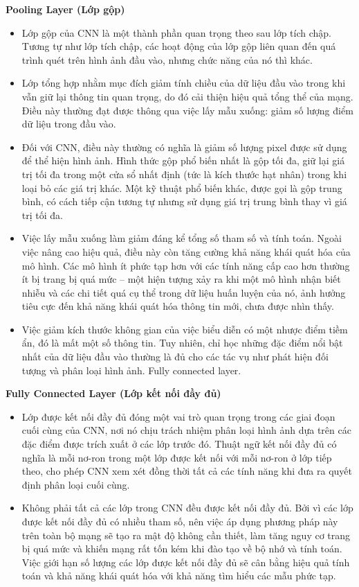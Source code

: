 \textbf{Pooling Layer (Lớp gộp)}
\begin{itemize}
	\item Lớp gộp của CNN là một thành phần quan trọng theo sau lớp tích chập. Tương tự như lớp tích chập, các hoạt động của lớp gộp liên quan đến quá trình quét trên hình ảnh đầu vào, nhưng chức năng của nó thì khác.
	\item Lớp tổng hợp nhằm mục đích giảm tính chiều của dữ liệu đầu vào trong khi vẫn giữ lại thông tin quan trọng, do đó cải thiện hiệu quả tổng thể của mạng. Điều này thường đạt được thông qua việc lấy mẫu xuống: giảm số lượng điểm dữ liệu trong đầu vào.
	\item Đối với CNN, điều này thường có nghĩa là giảm số lượng pixel được sử dụng để thể hiện hình ảnh. Hình thức gộp phổ biến nhất là gộp tối đa, giữ lại giá trị tối đa trong một cửa sổ nhất định (tức là kích thước hạt nhân) trong khi loại bỏ các giá trị khác. Một kỹ thuật phổ biến khác, được gọi là gộp trung bình, có cách tiếp cận tương tự nhưng sử dụng giá trị trung bình thay vì giá trị tối đa.
	\item Việc lấy mẫu xuống làm giảm đáng kể tổng số tham số và tính toán. Ngoài việc nâng cao hiệu quả, điều này còn tăng cường khả năng khái quát hóa của mô hình. Các mô hình ít phức tạp hơn với các tính năng cấp cao hơn thường ít bị trang bị quá mức – một hiện tượng xảy ra khi một mô hình nhận biết nhiễu và các chi tiết quá cụ thể trong dữ liệu huấn luyện của nó, ảnh hưởng tiêu cực đến khả năng khái quát hóa thông tin mới, chưa được nhìn thấy.
	\item Việc giảm kích thước không gian của việc biểu diễn có một nhược điểm tiềm ẩn, đó là mất một số thông tin. Tuy nhiên, chỉ học những đặc điểm nổi bật nhất của dữ liệu đầu vào thường là đủ cho các tác vụ như phát hiện đối tượng và phân loại hình ảnh. Fully connected layer.
\end{itemize}

\textbf{Fully Connected Layer (Lớp kết nối đầy đủ)}
\begin{itemize}
	\item Lớp được kết nối đầy đủ đóng một vai trò quan trọng trong các giai đoạn cuối cùng của CNN, nơi nó chịu trách nhiệm phân loại hình ảnh dựa trên các đặc điểm được trích xuất ở các lớp trước đó. Thuật ngữ kết nối đầy đủ có nghĩa là mỗi nơ-ron trong một lớp được kết nối với mỗi nơ-ron ở lớp tiếp theo, cho phép CNN xem xét đồng thời tất cả các tính năng khi đưa ra quyết định phân loại cuối cùng.
	\item Không phải tất cả các lớp trong CNN đều được kết nối đầy đủ. Bởi vì các lớp được kết nối đầy đủ có nhiều tham số, nên việc áp dụng phương pháp này trên toàn bộ mạng sẽ tạo ra mật độ không cần thiết, làm tăng nguy cơ trang bị quá mức và khiến mạng rất tốn kém khi đào tạo về bộ nhớ và tính toán. Việc giới hạn số lượng các lớp được kết nối đầy đủ sẽ cân bằng hiệu quả tính toán và khả năng khái quát hóa với khả năng tìm hiểu các mẫu phức tạp.
\end{itemize}

